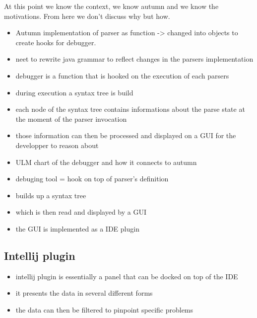 	At this point we know the context, we know autumn and we know the motivations. From here we don't discuss why but how.

	\begin{itemize}
		\item Autumn implementation of parser as function -> changed into objects to create hooks for debugger.
		\item neet to rewrite java grammar to reflect changes in the parsers implementation
		\item debugger is a function that is hooked on the execution of each parsers
		\item during execution a syntax tree is build
		\item each node of the syntax tree contains informations about the parse state at the moment of the parser invocation
		\item those information can then be processed and displayed on a GUI for the developper to reason about
		\item ULM chart of the debugger and how it connects to autumn
	\end{itemize}



	\begin{itemize}
		\item debuging tool = hook on top of parser's definition
		\item builds up a syntax tree
		\item which is then read and displayed by a GUI
		\item the GUI is implemented as a IDE plugin
	\end{itemize}

	\subsection{Intellij plugin}

	\begin{itemize}
		\item intellij plugin is essentially a panel that can be docked on top of the IDE
		\item it presents the data in several different forms
		\item the data can then be filtered to pinpoint specific problems
	\end{itemize}

